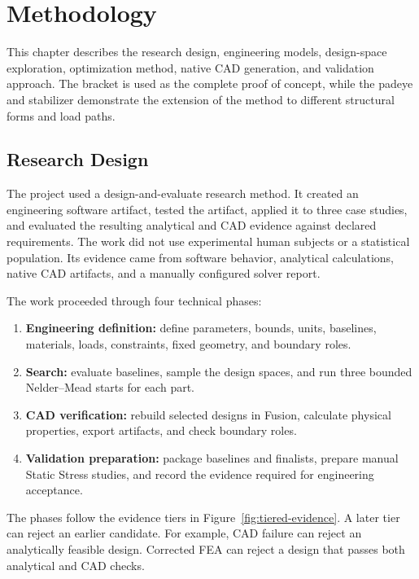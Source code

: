 \chapter{Methodology}
\label{chap:methodology}

This chapter describes the research design, engineering models,
design-space exploration, optimization method, native CAD generation, and
validation approach. The bracket is used as the complete proof of concept,
while the padeye and stabilizer demonstrate the extension of the method to
different structural forms and load paths.

\section{Research Design}
\label{sec:research-design}

The project used a design-and-evaluate research method. It created an
engineering software artifact, tested the artifact, applied it to three case
studies, and evaluated the resulting analytical and CAD evidence against
declared requirements. The work did not use experimental human subjects or a
statistical population. Its evidence came from software behavior, analytical
calculations, native CAD artifacts, and a manually configured solver report.

The work proceeded through four technical phases:

\begin{enumerate}
    \item \textbf{Engineering definition:} define parameters, bounds, units,
    baselines, materials, loads, constraints, fixed geometry, and boundary
    roles.
    \item \textbf{Search:} evaluate baselines, sample the design spaces, and
    run three bounded Nelder--Mead starts for each part.
    \item \textbf{CAD verification:} rebuild selected designs in Fusion,
    calculate physical properties, export artifacts, and check boundary roles.
    \item \textbf{Validation preparation:} package baselines and finalists,
    prepare manual Static Stress studies, and record the evidence required for
    engineering acceptance.
\end{enumerate}

The phases follow the evidence tiers in Figure~\ref{fig:tiered-evidence}. A
later tier can reject an earlier candidate. For example, CAD failure can
reject an analytically feasible design. Corrected FEA can reject a design that
passes both analytical and CAD checks.

